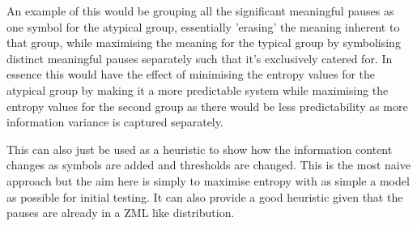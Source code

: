 An example of this would be grouping all the significant meaningful pauses as one symbol for the atypical group, essentially 'erasing' the meaning inherent to that group,  while maximising the meaning for the typical group by symbolising distinct meaningful pauses separately such that it's exclusively catered for. In essence this would have the effect of minimising the entropy values for the atypical group by making it a more predictable system while maximising the entropy values for the second group as there would be less predictability as more information variance is captured separately. 

This can also just be used as a heuristic to show how the information content changes as symbols are added and thresholds are changed. This is the most naive approach but the aim here is simply to maximise entropy with as simple a model as possible for initial testing. It can also provide a good heuristic given that the pauses are already in a ZML like distribution. 





%




